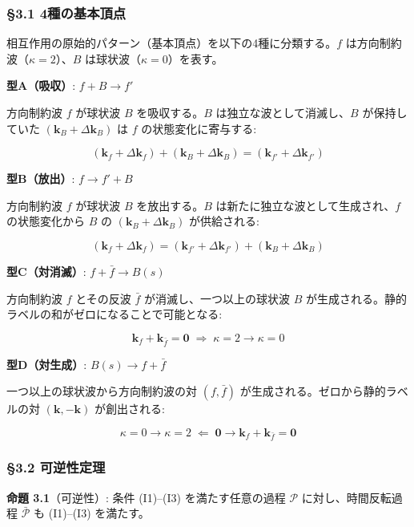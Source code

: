 \documentclass[
  a4paper,11pt]{ltjsarticle}
\theoremstyle{definition}
\theoremstyle{remark}
\begin{document}
\subsubsection{§3.1
4種の基本頂点}\label{ux7a2eux306eux57faux672cux9802ux70b9}

相互作用の原始的パターン（基本頂点）を以下の4種に分類する。\(f\)
は方向制約波（\(\kappa = 2\)）、\(B\) は球状波（\(\kappa = 0\)）を表す。

\textbf{型A（吸収）}: \(f + B \longrightarrow f'\)

方向制約波 \(f\) が球状波 \(B\) を吸収する。\(B\)
は独立な波として消滅し、\(B\) が保持していた
\((\mathbf{k}_B + \Delta\mathbf{k}_B)\) は \(f\) の状態変化に寄与する:

\[(\mathbf{k}_f + \Delta\mathbf{k}_f) + (\mathbf{k}_B + \Delta\mathbf{k}_B) = (\mathbf{k}_{f'} + \Delta\mathbf{k}_{f'})\]

\textbf{型B（放出）}: \(f \longrightarrow f' + B\)

方向制約波 \(f\) が球状波 \(B\) を放出する。\(B\)
は新たに独立な波として生成され、\(f\) の状態変化から \(B\) の
\((\mathbf{k}_B + \Delta\mathbf{k}_B)\) が供給される:

\[(\mathbf{k}_f + \Delta\mathbf{k}_f) = (\mathbf{k}_{f'} + \Delta\mathbf{k}_{f'}) + (\mathbf{k}_B + \Delta\mathbf{k}_B)\]

\textbf{型C（対消滅）}: \(f + \bar{f} \longrightarrow B(s)\)

方向制約波 \(f\) とその反波 \(\bar{f}\) が消滅し、一つ以上の球状波 \(B\)
が生成される。静的ラベルの和がゼロになることで可能となる:

\[\mathbf{k}_f + \mathbf{k}_{\bar{f}} = \mathbf{0} \;\Longrightarrow\; \kappa = 2 \to \kappa = 0\]

\textbf{型D（対生成）}: \(B(s) \longrightarrow f + \bar{f}\)

一つ以上の球状波から方向制約波の対 \((f, \bar{f})\)
が生成される。ゼロから静的ラベルの対 \((\mathbf{k}, -\mathbf{k})\)
が創出される:

\[\kappa = 0 \to \kappa = 2 \;\Longleftarrow\; \mathbf{0} \to \mathbf{k}_f + \mathbf{k}_{\bar{f}} = \mathbf{0}\]

\subsubsection{§3.2 可逆性定理}\label{ux53efux9006ux6027ux5b9aux7406}

\textbf{命題 3.1}（可逆性）: 条件 (I1)--(I3) を満たす任意の過程
\(\mathcal{P}\) に対し、時間反転過程 \(\bar{\mathcal{P}}\) も (I1)--(I3)
を満たす。
\end{document}
